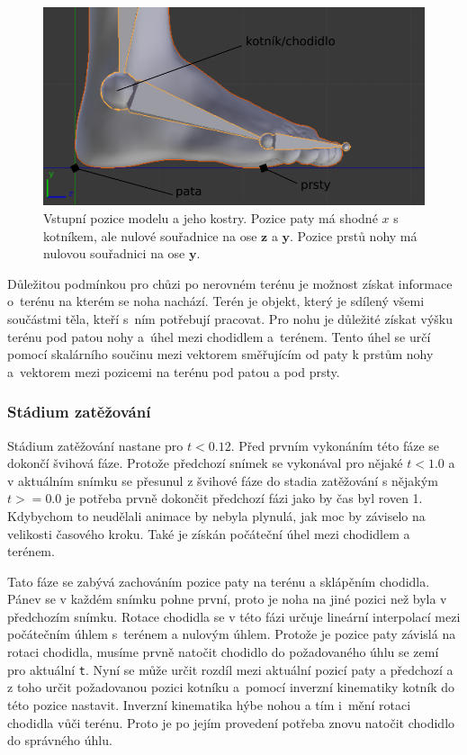 \begin{figure}[h]
	\centering
	\includegraphics[width=0.7\linewidth]{fig/pozice_paty.pdf}
	\caption{Vstupní pozice modelu a jeho kostry. Pozice paty má shodné $x$ s kotníkem, ale nulové souřadnice na ose $\mathbf{z}$ a $\mathbf{y}$. Pozice prstů nohy má nulovou souřadnici na ose $\mathbf{y}$.}
	\label{fig:pozice_paty}
\end{figure}

Důležitou podmínkou pro chůzi po nerovném terénu je možnost získat informace o~terénu na kterém se noha nachází. Terén je objekt, který je sdílený všemi součástmi těla, kteří s~ním potřebují pracovat. Pro nohu je důležité získat výšku terénu pod patou nohy a~úhel mezi chodidlem a~terénem. Tento úhel se určí pomocí skalárního součinu mezi vektorem směřujícím od paty k prstům nohy a~vektorem mezi pozicemi na terénu pod patou a pod prsty. 

\subsubsection{Stádium zatěžování}
Stádium zatěžování nastane pro $t < 0.12$. Před prvním vykonáním této fáze se dokončí švihová fáze. Protože předchozí snímek se vykonával pro nějaké $t < 1.0$ a v aktuálním snímku se přesunul z švihové fáze do stadia zatěžování s nějakým $t >= 0.0$ je potřeba prvně dokončit předchozí fázi jako by čas byl roven 1. Kdybychom to neudělali animace by nebyla plynulá, jak moc by záviselo na velikosti časového kroku. Také je získán počáteční úhel mezi chodidlem a terénem. 

Tato fáze se zabývá zachováním pozice paty na terénu a sklápěním chodidla. Pánev se v každém snímku pohne první, proto je noha na jiné pozici než byla v předchozím snímku. Rotace chodidla se v této fázi určuje lineární interpolací mezi počátečním úhlem s~terénem a nulovým úhlem. Protože je pozice paty závislá na rotaci chodidla, musíme prvně natočit chodidlo do požadovaného úhlu se zemí pro aktuální \texttt{t}. Nyní se může určit rozdíl mezi aktuální pozicí paty a předchozí a z toho určit požadovanou pozici kotníku a~pomocí inverzní kinematiky kotník do této pozice nastavit. Inverzní kinematika hýbe nohou a tím i~mění rotaci chodidla vůči terénu. Proto je po jejím provedení potřeba znovu natočit chodidlo do správného úhlu.

